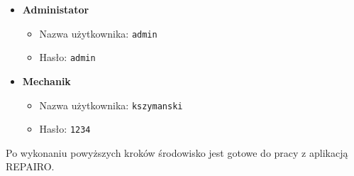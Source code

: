 \begin{itemize}
  \item \textbf{Administator}
  \begin{itemize}
    \item Nazwa użytkownika: \texttt{admin}
    \item Hasło: \texttt{admin}
  \end{itemize}

  \item \textbf{Mechanik}
  \begin{itemize}
    \item Nazwa użytkownika: \texttt{kszymanski}
    \item Hasło: \texttt{1234}
  \end{itemize}
\end{itemize}

\noindent
Po wykonaniu powyższych kroków środowisko jest gotowe do pracy z aplikacją REPAIRO.

